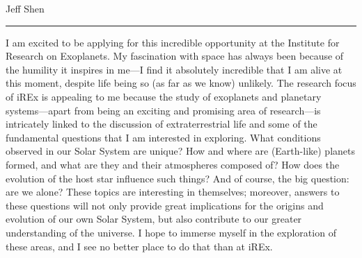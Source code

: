 \documentclass[10pt]{res}
\begin{document}
{\large Jeff Shen}

\begin{resume}
\vspace{-0.3cm}\rule{\textwidth}{0.2pt}\vspace{-0.1cm}

I am excited to be applying for this incredible opportunity at the Institute for Research on Exoplanets. My fascination with space has always been because of the humility it inspires in me—I find it absolutely incredible that I am alive at this moment, despite life being so (as far as we know) unlikely. The research focus of iREx is appealing to me because the study of exoplanets and planetary systems—apart from being an exciting and promising area of research—is intricately linked to the discussion of extraterrestrial life and some of the fundamental questions that I am interested in exploring. What conditions observed in our Solar System are unique? How and where are (Earth-like) planets formed, and what are they and their atmospheres composed of? How does the evolution of the host star influence such things? And of course, the big question: are we alone? These topics are interesting in themselves; moreover, answers to these questions will not only provide great implications for the origins and evolution of our own Solar System, but also contribute to our greater understanding of the universe. I hope to immerse myself in the exploration of these areas, and I see no better place to do that than at iREx. 


\end{resume}
\end{document}
